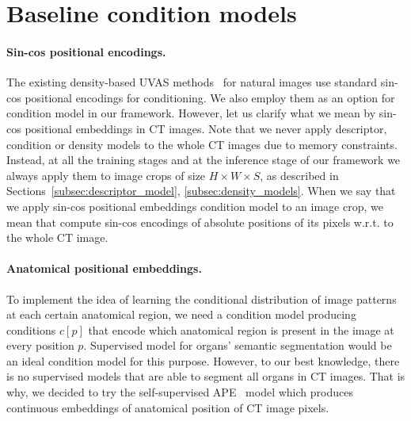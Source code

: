\section{Baseline condition models}
\label{appendix:condition_models}

\paragraph{Sin-cos positional encodings.} The existing density-based UVAS methods~\cite{cflow,msflow} for natural images use standard sin-cos positional encodings for conditioning. We also employ them as an option for condition model in our framework. However, let us clarify what we mean by sin-cos positional embeddings in CT images. Note that we never apply descriptor, condition or density models to the whole CT images due to memory constraints. Instead, at all the training stages and at the inference stage of our framework we always apply them to image crops of size $H \times W \times S$, as described in Sections~\ref{subsec:descriptor_model}, \ref{subsec:density_models}. When we say that we apply sin-cos positional embeddings condition model to an image crop, we mean that compute sin-cos encodings of absolute positions of its pixels w.r.t. to the whole CT image.

\paragraph{Anatomical positional embeddings.} To implement the idea of learning the conditional distribution of image patterns at each certain anatomical region, we need a condition model producing conditions $c[p]$ that encode which anatomical region is present in the image at every position $p$. Supervised model for organs' semantic segmentation would be an ideal condition model for this purpose. However, to our best knowledge, there is no supervised models that are able to segment all organs in CT images. That is why, we decided to try the self-supervised APE~\cite{ape} model which produces continuous embeddings of anatomical position of CT image pixels.